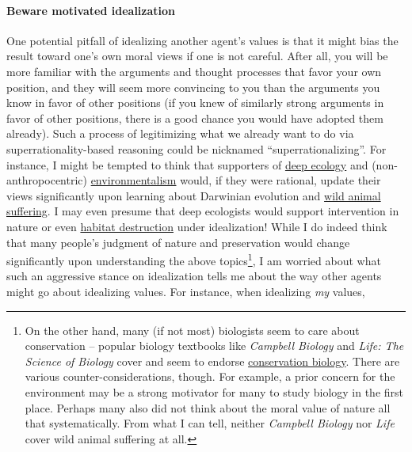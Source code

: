 \paragraph{Beware motivated
idealization}\label{beware-motivated-idealization}

One potential pitfall of idealizing another agent's values is that it
might bias the result toward one's own moral views if one is not
careful. After all, you will be more familiar with the arguments and
thought processes that favor your own position, and they will seem more
convincing to you than the arguments you know in favor of other
positions (if you knew of similarly strong arguments in favor of other
positions, there is a good chance you would have adopted them already).
Such a process of legitimizing what we already want to do via
superrationality-based reasoning could be nicknamed
``superrationalizing''. For instance, I might be tempted to think that
supporters of
\href{https://en.wikipedia.org/wiki/Deep_ecology}{deep ecology}
and (non-anthropocentric)
\href{https://en.wikipedia.org/wiki/Environmentalism}{environmentalism}
would, if they were rational, update their views significantly upon
learning about Darwinian evolution and
\href{https://foundational-research.org/the-importance-of-wild-animal-suffering/}{wild
animal suffering}. I may even presume that deep ecologists would
support intervention in nature or even
\href{http://reducing-suffering.org/habitat-destruction-not-preservation-generally-reduces-wild-animal-suffering/}{habitat
destruction} under idealization! While I do indeed think that many
people's judgment of nature and preservation would change significantly
upon understanding the above topics\footnote{On the other hand, many (if
  not most) biologists seem to care about conservation -- popular
  biology textbooks like \emph{Campbell Biology} \parencite{Urry2016-ey}
  and \emph{Life: The Science of Biology} \parencite{Sadava2012-er}
  cover and seem to endorse
  \href{https://en.wikipedia.org/wiki/Conservation_biology}{conservation
  biology}. There are various counter-considerations, though. For
  example, a prior concern for the environment may be a strong motivator
  for many to study biology in the first place. Perhaps many also did
  not think about the moral value of nature all that systematically. From what I can tell, neither \emph{Campbell
  Biology} nor \emph{Life} cover wild animal suffering at all.}, I am worried about what such an aggressive stance on
idealization tells me about the way other agents might go about
idealizing values. For instance, when idealizing \emph{my} values,
